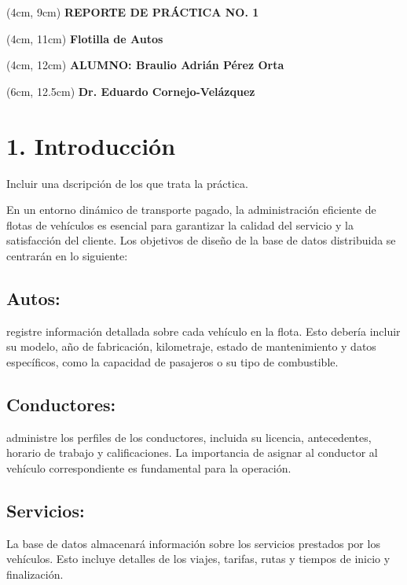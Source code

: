\documentclass{article}
\begin{document}
\BgThispage
\-
\begin{textblock*}{15cm}(4cm, 9cm)
    {\fontsize{30pt}{16pt}\selectfont
    \textcolor{rojo}{\textbf{REPORTE DE PRÁCTICA NO. 1}}
    }
\end{textblock*}
\begin{textblock*}{15cm}(4cm, 11cm)
    {\fontsize{15pt}{16pt}\selectfont
    \textcolor{rojo}{\textbf{Flotilla de Autos}}
    }
\end{textblock*}
\begin{textblock*}{15cm}(4cm, 12cm)
    {\fontsize{13pt}{16pt}\selectfont
    \textcolor{rojo}{\textbf{ALUMNO: Braulio Adrián Pérez Orta}}
    }
\end{textblock*}
\begin{textblock*}{15cm}(6cm, 12.5cm)
    {\fontsize{11pt}{16pt}\selectfont
    \textcolor{rojo}{\textbf{Dr. Eduardo Cornejo-Velázquez}}
    }
\end{textblock*}

\newpage

\section{1. Introducción}
    Incluir una dscripción de los que trata la práctica. 
   	
   	En un entorno dinámico de transporte pagado, la administración eficiente de flotas de vehículos es esencial para garantizar la calidad del servicio y la satisfacción del cliente. Los objetivos de diseño de la base de datos distribuida se centrarán en lo siguiente:
   	 \subsection{Autos:} registre información detallada sobre cada vehículo en la flota. Esto debería incluir su modelo, año de fabricación, kilometraje, estado de mantenimiento y datos específicos, como la capacidad de pasajeros o su tipo de combustible. 
   	 \subsection{Conductores:}administre los perfiles de los conductores, incluida su licencia, antecedentes, horario de trabajo y calificaciones. La importancia de asignar al conductor al vehículo correspondiente es fundamental para la operación.
   	
   	 \subsection{Servicios:} La base de datos almacenará información sobre los servicios prestados por los vehículos. Esto incluye detalles de los viajes, tarifas, rutas y tiempos de inicio y finalización.
   	
\end{document}
